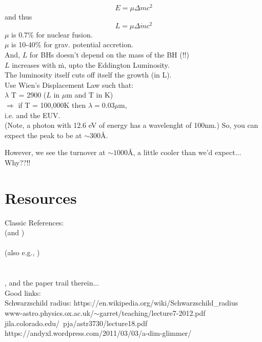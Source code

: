 \documentclass[11pt]{article}
\begin{document}
\begin{equation}
 E = \mu \Delta m c^{2} 
\end{equation}
and thus
\begin{equation}
 L = \mu \Delta \dot{m} c^{2} 
\end{equation}
$\mu$ is 0.7\% for nuclear fusion. \\
$\mu$ is 10-40\% for grav. potential accretion.  \\
And, $L$ for BHs doesn't depend on the mass of the BH (!!) \\

\noindent
$L$ increases with \.m, upto the Eddington Luminosity. \\
The luminosity itself cuts off itself the growth (in L). \\

\noindent
Use Wien's Displacement Law such that:\\
$\lambda$  T = 2900 ($L$ in $\mu$m and T in K)\\
$\Rightarrow$ if T = 100,000K then $\lambda=0.03\mu$m, \\
i.e. and the EUV. \\
(Note, a photon with 12.6 eV of energy has a wavelenght of 100nm.)
So, you can expect the peak to be at $\sim300$\AA. 

\noindent
However, we see the turnover at $\sim1000$\AA, 
a little cooler than we'd expect... Why??!!



\section{Resources}
Classic References:\\
\citet{SS73} (and \citet{King09}) \\
\citet{Pringle81}\\
(also e.g., \citet{Pringle72, Pringle73, Pringle96})\\
\citet{Richards06b}\\
\citet{Kishimoto08}\\
\citet{Lawrence12}, and the paper trail therein...\\

\noindent
Good links:\\
Schwarzschild radius: https://en.wikipedia.org/wiki/Schwarzschild\_radius\\
www-astro.physics.ox.ac.uk/$\sim$garret/teaching/lecture7-2012.pdf\\
jila.colorado.edu/~pja/astr3730/lecture18.pdf\\
https://andyxl.wordpress.com/2011/03/03/a-dim-glimmer/\\





\end{document}
